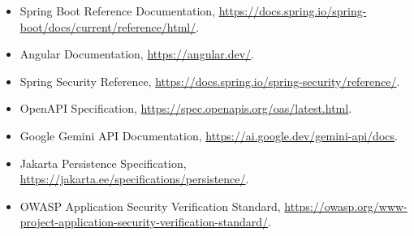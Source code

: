 \begin{sloppypar}
\begin{itemize}
\item Spring Boot Reference Documentation,
\url{https://docs.spring.io/spring-boot/docs/current/reference/html/}.
\item Angular Documentation, \url{https://angular.dev/}.
\item Spring Security Reference,
\url{https://docs.spring.io/spring-security/reference/}.
\item OpenAPI Specification, \url{https://spec.openapis.org/oas/latest.html}.
\item Google Gemini API Documentation,
\url{https://ai.google.dev/gemini-api/docs}.
\item Jakarta Persistence Specification,
\url{https://jakarta.ee/specifications/persistence/}.
\item OWASP Application Security Verification Standard,
\url{https://owasp.org/www-project-application-security-verification-standard/}.
\end{itemize}
\end{sloppypar}
